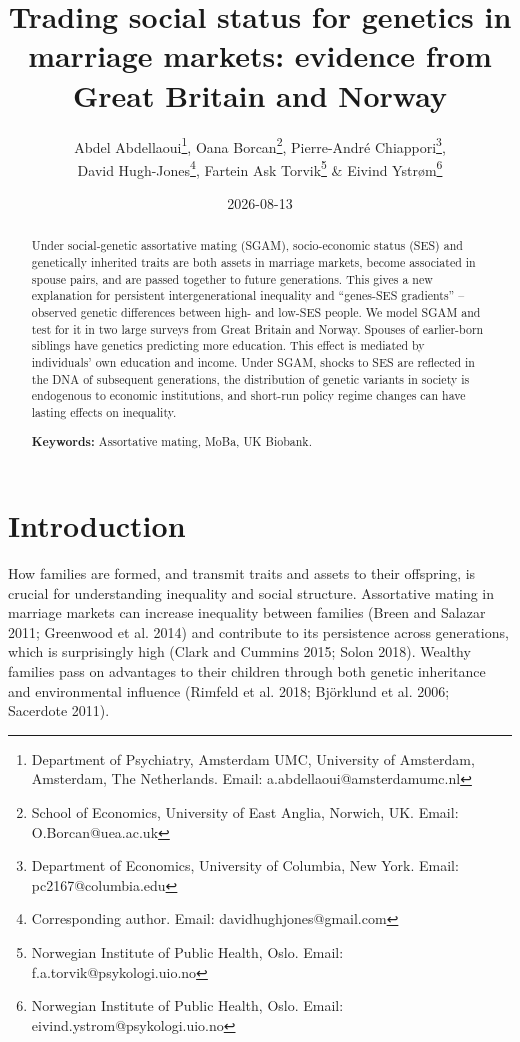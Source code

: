 \documentclass[
  12pt,
]{article}
\title{Trading social status for genetics in marriage markets:
evidence from Great Britain and Norway}
\author{Abdel Abdellaoui\thanks{Department of Psychiatry, Amsterdam UMC, University 
of Amsterdam, Amsterdam, The Netherlands. Email: a.abdellaoui@amsterdamumc.nl},
Oana Borcan\thanks{School of Economics, University of East Anglia, Norwich, 
UK. Email: O.Borcan@uea.ac.uk},
Pierre-André Chiappori\thanks{Department of Economics, University of Columbia, 
  New York. Email: pc2167@columbia.edu},\\
David Hugh-Jones\thanks{Corresponding author. Email: davidhughjones@gmail.com},
Fartein Ask Torvik\thanks{Norwegian Institute of Public Health, Oslo. 
  Email: f.a.torvik@psykologi.uio.no} \&
Eivind Ystrøm\thanks{Norwegian Institute of Public Health, Oslo. 
  Email: eivind.ystrom@psykologi.uio.no}}
\date{2026-08-13}
\theoremstyle{definition}
\theoremstyle{definition}
\theoremstyle{definition}
\theoremstyle{definition}
\theoremstyle{remark}
\begin{document}
\maketitle
\begin{abstract}
Under social-genetic assortative mating (SGAM), socio-economic status (SES) and
genetically inherited traits are both assets in marriage markets, become
associated in spouse pairs, and are passed together to future generations.
This gives a new explanation for persistent intergenerational inequality and
``genes-SES gradients'' -- observed genetic differences between high- and
low-SES people. We model SGAM and test for it in two large surveys from Great
Britain and Norway. Spouses of earlier-born siblings have genetics predicting
more education. This effect is mediated by individuals' own education and
income. Under SGAM, shocks to SES are reflected in the DNA of subsequent
generations, the distribution of genetic variants in society is endogenous
to economic institutions, and short-run policy regime changes can have
lasting effects on inequality.

\par

\textbf{Keywords:} Assortative mating, MoBa, UK Biobank.
\end{abstract}

\normalem

\section{Introduction}\label{introduction}

How families are formed, and transmit traits and assets to their
offspring, is crucial for understanding inequality and social structure.
Assortative mating in marriage markets can increase inequality between
families (Breen and Salazar 2011; Greenwood et al. 2014) and contribute to
its persistence across generations, which is surprisingly high
(Clark and Cummins 2015; Solon 2018). Wealthy families pass on
advantages to their children through both genetic inheritance and
environmental influence (Rimfeld et al. 2018; Björklund et al. 2006; Sacerdote 2011).
\end{document}
